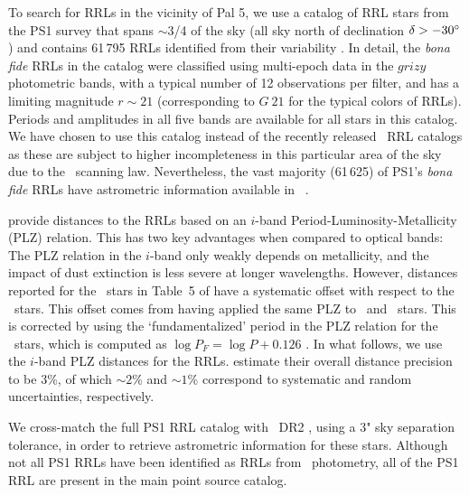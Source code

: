 \documentclass[twocolumn]{aastex63}
\begin{document}
To search for RRLs in the vicinity of Pal 5, we use a catalog of RRL stars from the PS1 survey that spans $\sim$3/4 of the sky (all sky north of declination $\delta > -30\mbox{$^\circ$}$) and contains 61\,795 RRLs identified from their variability \citep{Sesar2017b}.
In detail, the \emph{bona fide} RRLs in the catalog were classified using multi-epoch data in the $grizy$ photometric bands, with a typical number of 12 observations per filter, and has a limiting magnitude $r\sim21$ (corresponding to $G~21$ for the typical colors of RRLs).
Periods and amplitudes in all five bands are available for all stars in this catalog.
We have chosen to use this catalog instead of the recently released \Gaia~RRL catalogs \citep[VariClassifier and Specific Object Studies][]{Holl2018, Rimoldini2018, Clementini2018} as these are subject to higher incompleteness in this particular area of the sky due to the \Gaia\ scanning law. Nevertheless, the vast majority (61\,625) of PS1's \emph{bona fide} RRLs have astrometric information available in \Gaia~.

\citet{Sesar2017b} provide distances to the RRLs based on an $i$-band Period-Luminosity-Metallicity (PLZ) relation.
This has two key advantages when compared to optical bands: The PLZ relation in the $i$-band only weakly depends on metallicity, and the impact of dust extinction is less severe at longer wavelengths.
However, distances reported for the \rrc~stars in Table~5 of \citet{Sesar2017b} have a systematic offset with respect to the \typeab~stars.
This offset comes from having applied the same PLZ to \typeab~and \typec~stars.
This is corrected by using the `fundamentalized' period in the PLZ relation for the \rrc~stars, which is computed as $\log{P_F} = \log P + 0.126$ \citep[following][]{Braga2016}.
In what follows, we use the $i$-band PLZ distances for the RRLs.
\citet{Sesar2017b} estimate their overall distance precision to be 3\%, of which $\sim2$\% and $\sim1$\% correspond to systematic and random uncertainties, respectively.

We cross-match the full PS1 RRL catalog with \Gaia~DR2 \citep{Gaia:2018}, using a 3" sky separation tolerance, in order to retrieve astrometric information for these stars.
Although not all PS1 RRLs have been identified as RRLs from \Gaia\ photometry, all of the PS1 RRL are present in the main point source catalog.


\end{document}
